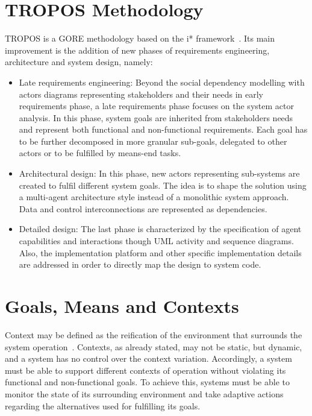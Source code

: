 \section{TROPOS Methodology}

TROPOS is a GORE methodology based on the i* framework~\cite{Bresciani:2004}. Its main improvement is the addition of new phases of requirements engineering, architecture and system design, namely:

\begin{itemize}

\item Late requirements engineering: Beyond the social dependency modelling with actors diagrams representing stakeholders and their needs in early requirements phase, a late requirements phase focuses on the system actor analysis. In this phase, system goals are inherited from stakeholders needs and represent both functional and non-functional requirements. Each goal has to be further decomposed in more granular sub-goals, delegated to other actors or to be fulfilled by means-end tasks. 
\medskip

\item Architectural design: In this phase, new actors representing sub-systems are created to fulfil different system goals. The idea is to shape the solution using a multi-agent architecture style instead of a monolithic system approach. Data and control interconnections are represented as dependencies.
\medskip

\item Detailed design: The last phase is characterized by the specification of agent capabilities and interactions though UML activity and sequence diagrams. Also, the implementation platform and other specific implementation details are addressed in order to directly map the design to system code.

\end{itemize}


\section{Goals, Means and Contexts}

Context may be defined as the reification of the environment that surrounds the system operation~\cite{Andrea01aframework}. Contexts, as already stated, may not be static, but dynamic, and a system has no control over the context variation. Accordingly, a system must be able to support different contexts of operation without violating its functional and non-functional goals. To achieve this, systems must be able to monitor the state of its surrounding environment and take adaptive actions regarding the alternatives used for fulfilling its goals.

